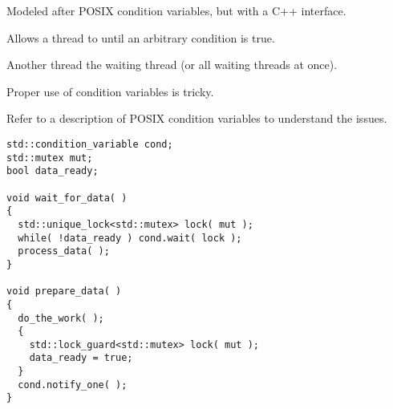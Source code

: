 \documentclass[landscape]{slides}
\begin{document}
%


Modeled after POSIX condition variables, but with a C++ interface.
\begin{citemize}
  \item Allows a thread to  until an arbitrary condition is true.
    \begin{citemize}
      \item Another thread  the waiting thread (or all waiting threads at once).
    \end{citemize}
  \item Proper use of condition variables is tricky.
    \begin{citemize}
      \item Refer to a description of POSIX condition variables to understand the issues.
    \end{citemize}
\end{citemize}
\stopslide


\vspace{2mm}
{\small
\begin{lstlisting}
std::condition_variable cond;
std::mutex mut;
bool data_ready;

void wait_for_data( )
{
  std::unique_lock<std::mutex> lock( mut );
  while( !data_ready ) cond.wait( lock );
  process_data( );
}

void prepare_data( )
{
  do_the_work( );
  {
    std::lock_guard<std::mutex> lock( mut );
    data_ready = true;
  }
  cond.notify_one( );
}
\end{lstlisting}
}
\stopslide

\end{document}
